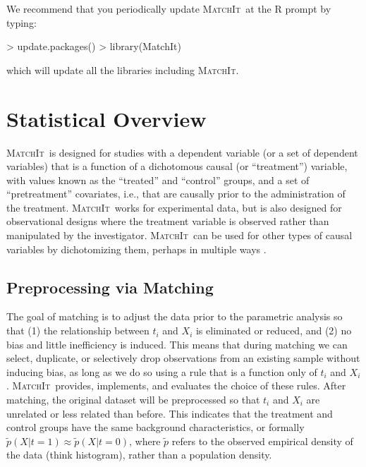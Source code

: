 \documentclass[oneside,letterpaper,titlepage]{article}
\newcommand{\MatchIt}{\textsc{MatchIt}}
\begin{document}
We recommend that you periodically update \MatchIt\ at the R prompt by typing:
\begin{Schunk}
\begin{Sinput}
> update.packages()
> library(MatchIt)
\end{Sinput}
\end{Schunk}
which will update all the libraries including \MatchIt.


\section{Statistical Overview}

\MatchIt\ is designed for studies with a dependent variable (or a set
of dependent variables) that is a function of a dichotomous causal (or
``treatment'') variable, with values known as the ``treated'' and
``control'' groups, and a set of ``pretreatment'' covariates, i.e.,
that are causally prior to the administration of the treatment.
\MatchIt\ works for experimental data, but is also designed for
observational designs where the treatment variable is observed rather
than manipulated by the investigator.  \MatchIt\ can be used for other
types of causal variables by dichotomizing them, perhaps in multiple
ways \citep[see also][]{ImaDyk04}.

\subsection{Preprocessing via Matching}

The goal of matching is to adjust the data prior to the parametric
analysis so that (1) the relationship between $t_i$ and $X_i$ is
eliminated or reduced, and (2) no bias and little inefficiency is
induced.  This means that during matching we can select, duplicate, or
selectively drop observations from an existing sample without inducing
bias, as long as we do so using a rule that is a function only of
$t_i$ and $X_i$.  \MatchIt\ provides, implements, and evaluates the
choice of these rules.  After matching, the original dataset will be
preprocessed so that $t_i$ and $X_i$ are unrelated or less related
than before. This indicates that the treatment and control groups have
the same background characteristics, or formally $\tilde p(X|t=1)
\approx \tilde p(X|t=0)$, where $\tilde p$ refers to the observed
empirical density of the data (think histogram), rather than a
population density.
\end{document}
